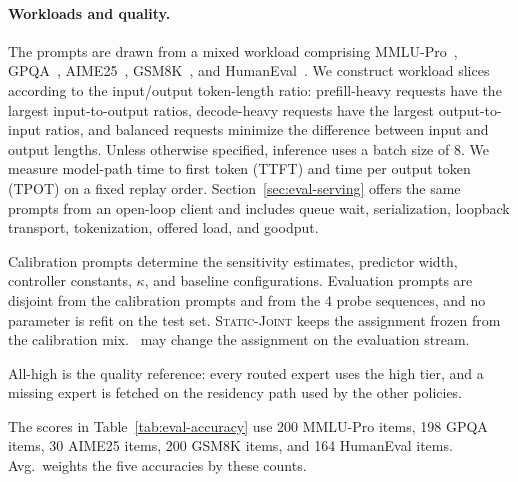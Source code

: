 \paragraph{Workloads and quality.}
The prompts are drawn from a mixed workload comprising MMLU-Pro~\cite{wang2024mmlu}, GPQA~\cite{rein2024gpqa}, AIME25~\cite{zhang2025aime25}, GSM8K~\cite{cobbe2021gsm8k}, and HumanEval~\cite{chen2021evaluating}. We construct workload slices according to the input/output token-length ratio: prefill-heavy requests have the largest input-to-output ratios, decode-heavy requests have the largest output-to-input ratios, and balanced requests minimize the difference between input and output lengths. Unless otherwise specified, inference uses a batch size of 8. We measure model-path time to first token (TTFT) and time per output token (TPOT) on a fixed replay order. Section~\ref{sec:eval-serving} offers the same prompts from an open-loop client and includes queue wait, serialization, loopback transport, tokenization, offered load, and goodput.

Calibration prompts determine the sensitivity estimates, predictor width, controller constants, \(\kappa\), and baseline configurations. Evaluation prompts are disjoint from the calibration prompts and from the 4 probe sequences, and no parameter is refit on the test set. \textsc{Static-Joint} keeps the assignment frozen from the calibration mix. \systemname\ may change the assignment on the evaluation stream.

All-high is the quality reference: every routed expert uses the high tier, and a missing expert is fetched on the residency path used by the other policies.

The scores in Table~\ref{tab:eval-accuracy} use 200 MMLU-Pro items, 198 GPQA items, 30 AIME25 items, 200 GSM8K items, and 164 HumanEval items. Avg.\ weights the five accuracies by these counts.

